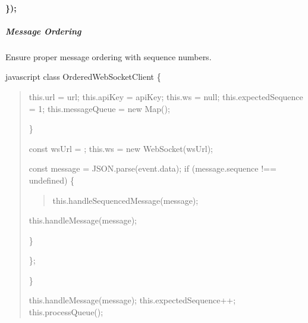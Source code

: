 \documentclass[letterpaper,10pt,english]{sphinxmanual}
\begin{document}
\paragraph{\});}
\label{\detokenize{api/websocket-api:id120}}

\subparagraph{Message Ordering}
\label{\detokenize{api/websocket-api:message-ordering}}
\sphinxAtStartPar
Ensure proper message ordering with sequence numbers.

\sphinxAtStartPar
{\color{red}\bfseries{}\textasciigrave{}\textasciigrave{}}{\color{red}\bfseries{}\textasciigrave{}}javascript
class OrderedWebSocketClient \{
\begin{quote}
\begin{description}
\sphinxAtStartPar
this.url = url;
this.apiKey = apiKey;
this.ws = null;
this.expectedSequence = 1;
this.messageQueue = new Map();

\end{description}

\sphinxAtStartPar
\}
\begin{description}
\sphinxAtStartPar
const wsUrl = ;
this.ws = new WebSocket(wsUrl);
\begin{description}
\sphinxAtStartPar
const message = JSON.parse(event.data);
if (message.sequence !== undefined) \{
\begin{quote}

\sphinxAtStartPar
this.handleSequencedMessage(message);
\end{quote}
\begin{description}
\sphinxAtStartPar
this.handleMessage(message);

\end{description}

\sphinxAtStartPar
\}

\end{description}

\sphinxAtStartPar
\};

\end{description}

\sphinxAtStartPar
\}
\begin{description}
\begin{description}
\sphinxAtStartPar
this.handleMessage(message);
this.expectedSequence++;
this.processQueue();


\end{description}
\end{description}
\end{quote}
\end{document}
